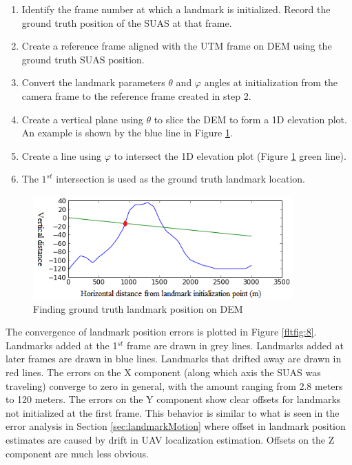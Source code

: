 \begin{enumerate}
  \item Identify the frame number at which a landmark is initialized.
  Record the ground truth position of the SUAS at that frame.
  \item Create a reference frame aligned with the UTM frame on DEM
  using the ground truth SUAS position.
  \item Convert the landmark parameters $\theta$ and $\varphi$
  angles at initialization from the camera frame to the reference frame created in step 2. 
  \item Create a vertical plane using $\theta$ to slice the DEM to
  form a 1D elevation plot. An example is shown by the blue line in Figure
  \ref{fltfig:7}.
  \item Create a line using $\varphi$ to intersect the 1D elevation plot
  (Figure \ref{fltfig:7} green line). 
  \item The $1^{st}$ intersection is used as the ground truth landmark
  location.
\end{enumerate}

\begin{figure}[h]
\centering
\includegraphics[width=10cm, keepaspectratio=true]
{./Figures/fltfig/find_groundtruth.png}
\caption{Finding ground truth landmark position on DEM}
\label{fltfig:7}
\end{figure}

The convergence of landmark position errors is plotted in Figure
\ref{fltfig:8}. Landmarks added at the 1$^{st}$ frame are drawn in
grey lines. Landmarks added at later frames are drawn in blue lines.
Landmarks that drifted away are drawn in red lines. The errors on the
X component (along which axis the SUAS was traveling) converge to zero
in general, with the amount ranging from 2.8 meters to 120 meters. The
errors on the Y component show clear offsets for landmarks not
initialized at the first frame. This behavior is similar to what is
seen in the error analysis in Section \ref{sec:landmarkMotion} where
offset in landmark position estimates are caused by drift in UAV
localization estimation. Offsets on the Z component are much less
obvious.

